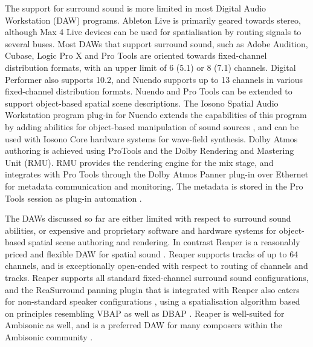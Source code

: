 \documentclass{article}
\begin{document}
The support for surround sound is more limited in most Digital Audio Workstation (DAW) programs.
Ableton Live is primarily geared towards stereo, although Max 4 Live devices can be used for spatialisation by routing signals to several buses.
Most DAWs that support surround sound, such as Adobe Audition, Cubase, Logic Pro X and Pro Tools are oriented towards fixed-channel distribution formats, with an upper limit of 6 (5.1) or 8 (7.1) channels.
Digital Performer also supports 10.2, and Nuendo supports up to 13 channels in various fixed-channel distribution formats.
Nuendo and Pro Tools can be extended to support object-based spatial scene descriptions.
The Iosono Spatial Audio Workstation program plug-in for Nuendo extends the capabilities of this program by adding abilities for object-based manipulation of sound sources \cite{iosono2012:workstation}, and can be used with Iosono Core hardware systems for wave-field synthesis.
Dolby Atmos authoring is achieved using ProTools and the Dolby Rendering and Mastering Unit (RMU).
RMU provides the rendering engine for the mix stage, and integrates with Pro Tools through the Dolby Atmos Panner plug-in over Ethernet for metadata communication and monitoring. 
The metadata is stored in the Pro Tools session as plug-in automation \cite{dolby:2013authoring}.

The DAWs discussed so far are either limited with respect to surround sound abilities, or expensive and proprietary software and hardware systems for object-based spatial scene authoring and rendering.
In contrast Reaper is a reasonably priced and flexible DAW for spatial sound \cite{cockos:2014reaper}.
Reaper supports tracks of up to 64 channels, and is exceptionally open-ended with respect to routing of channels and tracks.
Reaper supports all standard fixed-channel surround sound configurations, and the ReaSurround panning plugin that is integrated with Reaper also caters for non-standard speaker configurations \cite{francis:2014_reaper}, using a spatialisation algorithm based on principles resembling VBAP \cite{Pulkki:1997vbap} as well as DBAP \cite{Lossius:2009dbap}.
Reaper is well-suited for Ambisonic as well, and is a preferred DAW for many composers within the Ambisonic  community \cite{wiggins:2012reaperhowto}.
\end{document}
